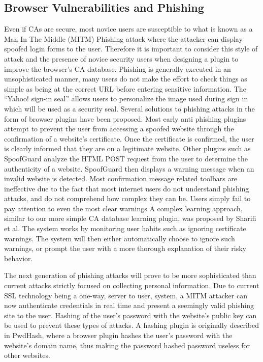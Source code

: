 \documentclass[10pt,twocolumn,pdftex]{article}
\begin{document}
\subsection{Browser Vulnerabilities and Phishing}
Even if CAs are secure, most novice users are susceptible to what is known as a Man In The Middle (MITM) Phishing attack where the attacker can display spoofed login forms to the user.  Therefore it is important to consider this style of attack and the presence of novice security users when designing a plugin to improve the browser's CA database.  Phishing is generally executed in an unsophisticated manner, many users do not make the effort to check things as simple as being at the correct URL before entering sensitive information.  \cite{dhamija2006phishing} \cite{raffetseder2007building} The “Yahoo! sign-in seal” allows users to personalize the image used during sign in which will be used as a security seal.\cite{agarwal2007phishing} Several solutions to phishing attacks in the form of browser plugins have been proposed.  Most early anti phishing plugins attempt to prevent the user from accessing a spoofed website through the confirmation of a website's certificate.  Once the certificate is confirmed, the user is clearly informed that they are on a legitimate website.   \cite{joshiPhishguardPlugin} \cite{biddle2009browser} \cite{mahmood2006Plugin} \cite{upadhyayaPlugin} \cite{maurerShiningChrome} \cite{ye2005trusted} Other plugins such as SpoofGuard analyze the HTML POST request from the user to determine the authenticity of a website.  SpoofGuard then displays a warning message when an invalid website is detected. \cite{chou2004client}
 Most confirmation message related toolbars are ineffective due to the fact that most internet users do not understand phishing attacks, and do not comprehend how complex they can be.  Users simply fail to pay attention to even the most clear warnings \cite{wu2006security} A complex learning approach, similar to our more simple CA database learning plugin, was proposed by Sharifi et al.  \cite{sharifiPersonalizedSecurity} The system works by monitoring user habits such as ignoring certificate warnings.  The system will then either automatically choose to ignore such warnings, or prompt the user with a more thorough explanation of their risky behavior. 

The next generation of phishing attacks will prove to be more sophisticated than current attacks strictly focused on collecting personal information.  Due to current SSL technology being a one-way, server to user, system, a MITM attacker can now authenticate credentials in real time and present a seemingly valid phishing site to the user.  Hashing of the user’s password with the website’s public key can be used to prevent these types of attacks. \cite{joshiMitigatingMITM}  A hashing plugin is originally described in PwdHash, where a browser plugin hashes the user’s password with the website’s domain name, thus making the password hashed password useless for other websites. \cite{ross2005strongerauthen}
\end{document}
